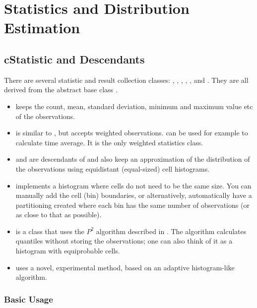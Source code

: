 \section{Statistics and Distribution Estimation}
\label{sec:ch-sim-lib:statistics}

\subsection{cStatistic and Descendants}

There are several statistic and result collection classes:
, , ,
, ,  and
. They are all derived from the abstract base class
.

\begin{itemize}
  \item{ keeps the count, mean, standard
    deviation, minimum and maximum value etc of the observations.}
  \item{ is similar to , but
    accepts weighted observations.  can be used
    for example to calculate time average. It is the only weighted
    statistics class.}
  \item{ and  are
    descendants of  and also keep an approximation of
    the distribution of the observations using equidistant
    (equal-sized) cell histograms.}
  \item{ implements a histogram where cells do not
    need to be the same size. You can manually add the cell (bin)
    boundaries, or alternatively, automatically have a partitioning
    created where each bin has the same number of observations (or as
    close to that as possible).}
  \item{ is a class that uses the $P^{2}$ algorithm
    described in \cite{JCh85}. The algorithm calculates quantiles without
    storing the observations; one can also think of it as a histogram
    with equiprobable cells.}
  \item{ uses a novel, experimental method, based on an
    adaptive histogram-like algorithm.}
\end{itemize}

\subsubsection{Basic Usage}

